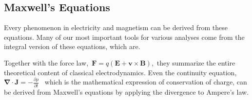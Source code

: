 \subsection{Maxwell's Equations}
\begin{center}
\end{center}
Every phenomenon in electricity and magnetism can be derived from these equations. Many of our most important tools for various analyses come from the integral version of these equations, which are.
\begin{center}
\end{center} 
Together with the force law,\ $\mathbf{F}=q(\mathbf{E}+\mathbf{v} \times \mathbf{B})$,\ they summarize the entire theoretical content of classical electrodynamics. Even the continuity equation,\ $\boldsymbol{\nabla} \cdot \mathbf{J}=-\frac{\partial \rho}{\partial t}$ \ which is the mathematical expression of conservation of charge, can be derived from Maxwell's equations by applying the divergence to Ampere's law.
